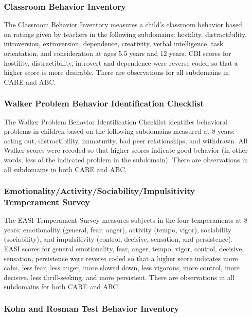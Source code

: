  \subsubsection{Classroom Behavior Inventory}

  The Classroom Behavior Inventory measures a child's classroom behavior based on ratings given by teachers in the following subdomains: hostility, distractibility, introversion, extroversion, dependence, creativity, verbal intelligence, task orientation, and consideration at ages 5.5 years and 12 years. CBI scores for hostility, distractibility, introvert and dependence were reverse coded so that a higher score is more desirable. There are observations for all subdomains in CARE and ABC. 

  \subsubsection{Walker Problem Behavior Identification Checklist}

  The Walker Problem Behavior Identification Checklist identifies behavioral problems in children based on the following subdomains measured at 8 years: acting out, distractibility, immaturity, bad peer relationships, and withdrawn. All Walker scores were recoded so that higher scores indicate good behavior (in other words, less of the indicated problem in the subdomain). There are observations in all subdomains in both CARE and ABC. 

  \subsubsection{Emotionality/Activity/Sociability/Impulsitivity Temperament Survey}

  The EASI Temperament Survey measures subjects in the four temperaments at 8 years: emotionality (general, fear, anger), activity (tempo, vigor), sociability (sociability), and impulsitivity (control, decisive, sensation, and persistence). EASI scores for general emotionality, fear, anger, tempo, vigor, control, decisive, sensation, persistence were reverse coded so that a higher score indicates more calm, less fear, less anger, more slowed down, less vigorous, more control, more decisive, less thrill-seeking, and more persistent. There are observations in all subdomains for both CARE and ABC. 

  \subsubsection{Kohn and Rosman Test Behavior Inventory}

